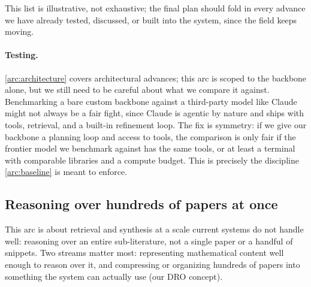This list is illustrative, not exhaustive; the final plan should fold in every advance we have already tested, discussed, or built into the system, since the field keeps moving.

\paragraph{Testing.}
\ref{arc:architecture} covers architectural advances; this arc is scoped to the backbone alone, but we still need to be careful about what we compare it against. Benchmarking a bare custom backbone against a third-party model like Claude might not always be a fair fight, since Claude is agentic by nature and ships with tools, retrieval, and a built-in refinement loop. The fix is symmetry: if we give our backbone a planning loop and access to tools, the comparison is only fair if the frontier model we benchmark against has the same tools, or at least a terminal with comparable libraries and a compute budget. This is precisely the discipline \ref{arc:baseline} is meant to enforce.


\subsection{Reasoning over hundreds of papers at once}
\label{arc:data_representation}
\label{arc:corpus}

\begin{summarybox}
    This arc is about retrieval and synthesis at a scale current systems do not handle well: reasoning over an entire sub-literature, not a single paper or a handful of snippets. Two streams matter most: representing mathematical content well enough to reason over it, and compressing or organizing hundreds of papers into something the system can actually use (our DRO concept).
\end{summarybox}

